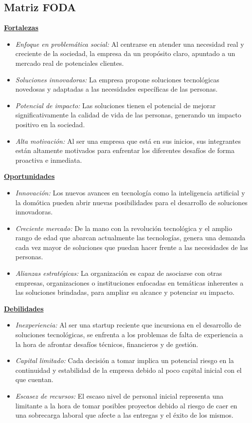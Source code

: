 \documentclass[a4paper,12pt]{article}
\begin{document}
    \subsection{Matriz FODA}
    \textbf{\underline{Fortalezas}}
    \begin{itemize}
        \item[] \textit{Enfoque en problemática social:} Al centrarse en atender una necesidad real y creciente de la sociedad, la empresa da un propósito claro, apuntado a un mercado real de potenciales clientes.
        \item[] \textit{Soluciones innovadoras:} La empresa propone soluciones tecnológicas novedosas y adaptadas a las necesidades específicas de las personas.
        \item[] \textit{Potencial de impacto:} Las soluciones tienen el potencial de mejorar significativamente la calidad de vida de las personas, generando un impacto positivo en la sociedad.
        \item[] \textit{Alta motivación:} Al ser una empresa que está en sus inicios, sus integrantes están altamente motivados para enfrentar los diferentes desafíos de forma proactiva e inmediata.
    \end{itemize}
    \newpage
    \textbf{\underline{Oportunidades}}
    \begin{itemize}
        \item[] \textit{Innovación:} Los nuevos avances en tecnología como la inteligencia artificial y la domótica pueden abrir nuevas posibilidades para el desarrollo de soluciones innovadoras.
        \item[] \textit{Creciente mercado:} De la mano con la revolución tecnológica y el amplio rango de edad que abarcan actualmente las tecnologías, genera una demanda cada vez mayor de soluciones que puedan hacer frente a las necesidades de las personas.
        \item[] \textit{Alianzas estratégicas:} La organización es capaz de asociarse con otras empresas, organizaciones o instituciones enfocadas en temáticas inherentes a las soluciones brindadas, para ampliar su alcance y potenciar su impacto.
    \end{itemize}
    \textbf{\underline{Debilidades}}
    \begin{itemize}
        \item[] \textit{Inexperiencia:} Al ser una startup reciente que incursiona en el desarrollo de soluciones tecnológicas, se enfrenta a los problemas de falta de experiencia a la hora de afrontar desafíos técnicos, financieros y de gestión.
        \item[] \textit{Capital limitado:} Cada decisión a tomar implica un potencial riesgo en la continuidad y estabilidad de la empresa debido al poco capital inicial con el que cuentan.
        \item[] \textit{Escasez de recursos:} El escaso nivel de personal inicial representa una limitante a la hora de tomar posibles proyectos debido al riesgo de caer en una sobrecarga laboral que afecte a las entregas y el éxito de los mismos.
    \end{itemize}
\end{document}
